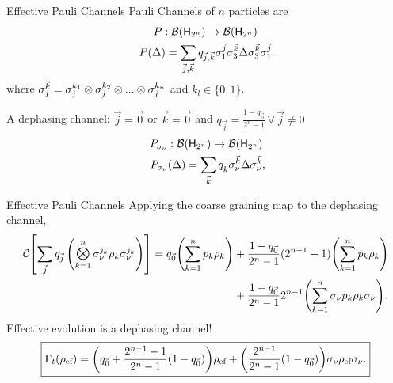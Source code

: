 \begin{frame}{Effective Pauli Channels}
    Pauli Channels of $n$ particles are
    \begin{gather}
        P:\mcB(\hilbert_{2^{n}}) \rightarrow \mcB(\hilbert_{2^{n}})\nonumber\\
        P(\Delta)=\sum_{\vec{j},\vec{k}}q_{\vec{j},\vec{k}}\pauli{1}^{\vec{j}}\pauli{3}^{\vec{k}}\Delta\pauli{3}^{\vec{k}}\pauli{1}^{\vec{j}}\rlap{.}\nonumber
    \end{gather}
    where $\sigma_{j}^{\vec{k}}=\sigma_{j}^{k_{1}}\otimes\sigma_{j}^{k_{2}}\otimes ... \otimes \sigma_{j}^{k_{n}}$ and $k_{l}\in\{0,1\}$. 
    
    A dephasing channel: $\vec{j}=\vec{0}$ or $\vec{k}=\vec{0}$ and $q_{\vec{j}}=\frac{1-q_{\vec{0}}}{2^{n}-1}\,\forall\,\vec{j}\neq 0$
    \begin{gather}
        P_{\pauli{\nu}}:\mcB(\hilbert_{2^{n}}) \rightarrow \mcB(\hilbert_{2^{n}})\nonumber\\
        P_{\pauli{\nu}}(\Delta)=\sum_{\vec{k}}q_{\vec{k}}\pauli{\nu}^{\vec{k}}\Delta\pauli{\nu}^{\vec{k}}\rlap{,}\nonumber
    \end{gather}
\end{frame}

\begin{frame}{Effective Pauli Channels}
    Applying the coarse graining map to the dephasing channel,
    \begin{align}
        \mcC\qty[\sum_{\vec{j}}q_{\vec{j}}\,\qty(\Motimes_{k=1}^{n} \pauli{\nu}^{j_{k}}\rho_{k}\pauli{\nu}^{j_{k}})]=q_{\vec{0}}\qty(\sum_{k=1}^{n}p_{k}\rho_{k})&+\frac{1-q_{\vec{0}}}{2^{n}-1}(2^{n-1}-1)\qty(\sum_{k=1}^{n}p_{k}\rho_{k})\nonumber\\
        &+\frac{1-q_{\vec{0}}}{2^{n}-1}2^{n-1}\qty(\sum_{k=1}^{n}\pauli{\nu}p_{k}\rho_{k}\pauli{\nu}).\nonumber
    \end{align}
    Effective evolution is a dephasing channel!
    \begin{equation}
        \boxed{\Gamma_{t}(\rho_{\text{ef}})=\qty(q_{\vec{0}}+\frac{2^{n-1}-1}{2^{n}-1}(1-q_{\vec{0}}))\rho_{\text{ef}}+\qty(\frac{2^{n-1}}{2^{n}-1}(1-q_{\vec{0}}))\sigma_{\nu}\rho_{\text{ef}}\sigma_{\nu}.}\nonumber
    \end{equation}
\end{frame}